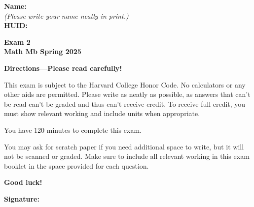 \documentclass{article}
\begin{document}
 
 
{\large \mbox{} \hfill \bf Name:\underline{\hspace{3in}}}\\[2pt]
{\mbox{} \hfill \it (Please write your name neatly in print.)}\\[12pt]
{\large \mbox{} \hfill \bf HUID:\underline{\hspace{3in}}}
 
\medskip
 
\noindent
{\large\bf
Exam 2\\
Math Mb Spring 2025}
\noindent


{\Large
\begin{center}\textbf{Directions---Please read carefully!} \end{center}}

This exam is subject to the Harvard College Honor Code. No calculators or any other aids are permitted.  Please write as neatly as possible, as answers that can't be read can't be graded and thus can't receive credit. To receive full credit, you must show relevant working
and include units when appropriate. 

You have 120 minutes to complete this exam. 

You may ask for scratch paper if you need additional space to write, but it will not be scanned or graded. Make sure to include all relevant working in this exam booklet in the space provided for each question.

\begin{center}\textbf{Good luck!}\end{center}


\vfill

\vspace{0.3in}

{\large \mbox{} \hfill \bf Signature:\underline{\hspace{3in}}}
\thispagestyle{empty}

\newpage
\end{document}
